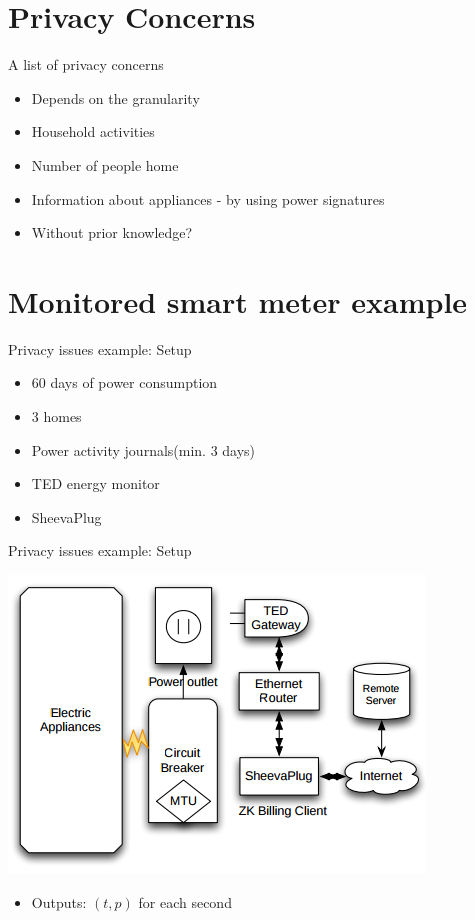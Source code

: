 \documentclass[10pt]{beamer}
\begin{document}
\section{Privacy Concerns}
\begin{frame}{A list of privacy concerns}{}
  \begin{itemize}
    \itemsep2em
  \item Depends on the granularity
  \item Household activities
  \item Number of people home
  \item Information about appliances - by using power signatures
  \item Without prior knowledge?
  \end{itemize}
\end{frame}

\section{Monitored smart meter example}
\begin{frame}{Privacy issues example: Setup}
  \begin{itemize}
    \itemsep2em 
    \item 60 days of power consumption
    \item 3 homes
    \item Power activity journals(min. 3 days)
    \item TED energy monitor
    \item SheevaPlug
    \end{itemize}
\end{frame}

\begin{frame}{Privacy issues example: Setup}
  \begin{center}
  \includegraphics[scale=.5]{graphics/TED_architecture.png}  
  \end{center}
  \begin{itemize}
  \item Outputs: $(t,p)$ for each second
  \end{itemize}
\end{frame}
\end{document}
